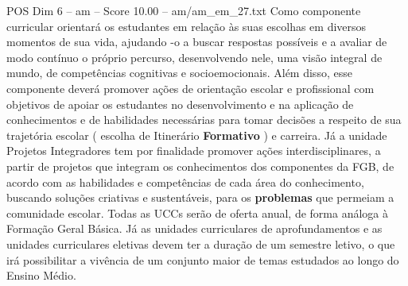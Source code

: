 \begin{textsample}{POS Dim 6 – am – Score 10.00 – am/am\_em\_27.txt}
Como componente curricular orientará os estudantes em relação às suas escolhas em diversos momentos de sua vida, ajudando -o a buscar respostas possíveis e a avaliar de modo contínuo o próprio percurso, desenvolvendo nele, uma visão integral de mundo, de competências cognitivas e socioemocionais.
Além disso, esse componente deverá promover ações de orientação escolar e profissional com objetivos de apoiar os estudantes no desenvolvimento e na aplicação de conhecimentos e de habilidades necessárias para tomar decisões a respeito de sua trajetória escolar ( escolha de Itinerário \textbf{Formativo} ) e carreira.
Já a unidade Projetos Integradores tem por finalidade promover ações interdisciplinares, a partir de projetos que integram os conhecimentos dos componentes da FGB, de acordo com as habilidades e competências de cada área do conhecimento, buscando soluções criativas e sustentáveis, para os \textbf{problemas} que permeiam a comunidade escolar.
Todas as UCCs serão de oferta anual, de forma análoga à Formação Geral Básica.
Já as unidades curriculares de aprofundamentos e as unidades curriculares eletivas devem ter a duração de um semestre letivo, o que irá possibilitar a vivência de um conjunto maior de temas estudados ao longo do Ensino Médio.

\end{textsample}
